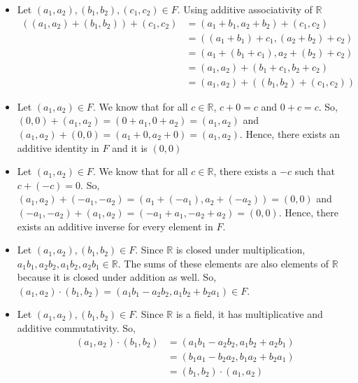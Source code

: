 \documentclass[12pt]{article}
\begin{document}
\begin{enumerate}[start=1,label={\bfseries Problem \arabic*:},leftmargin=1in]
\begin{enumerate}
\begin{itemize}
            \item Let $(a_{1}, a_{2}), (b_{1}, b_{2}), (c_{1},c_{2}) \in F$. Using additive associativity of $\mathbb{R}$ 
            \begin{align*}
                ((a_{1}, a_{2}) +  (b_{1}, b_{2})) + (c_{1}, c_{2}) &= (a_{1} + b_{1}, a_{2} + b_{2}) + (c_{1}, c_{2})\\ 
                &= ((a_{1} + b_{1}) + c_{1}, (a_{2} + b_{2}) + c_{2}) \\ 
                &= (a_{1} + (b_{1} + c_{1}), a_{2} + (b_{2}) + c_{2}) \\ 
                &= (a_1, a_{2}) + (b_{1} + c_{1}, b_{2}+ c_{2}) \\ 
                &= (a_{1}, a_{2}) +((b_{1}, b_{2}) + (c_{1}, c_{2}))
            \end{align*}
            \item Let $(a_{1}, a_{2}) \in F$. We know that for all $c \in \mathbb{R}$, $c+ 0 = c$ and $0 + c = c$.  
            So, $(0, 0) + (a_{1}, a_{2})  = (0 + a_{1}, 0 + a_{2}) = (a_{1}, a_{2})$ and 
            $(a_{1}, a_{2}) + (0, 0) = (a_{1} + 0, a_{2} + 0) = (a_{1}, a_{2})$. Hence, there exists an additive identity in $F$ and it is $(0, 0)$
            \item Let $(a_{1}, a_{2}) \in F$. We know that for all $c \in \mathbb{R}$, there exists a $-c$ such that $c + (-c) = 0$. 
            So, $(a_1, a_{2}) + (-a_{1}, -a_{2}) = (a_{1} + (-a_{1}), a_{2} + (-a_{2})) = (0, 0)$ and 
            $(-a_{1}, -a_{2}) + (a_{1}, a_{2}) = (-a_{1} + a_{1}, -a_{2} + a_{2}) = (0, 0)$. Hence, there exists an additive inverse for every element in $F$. 

            \item Let $(a_{1}, a_{2}), (b_{1}, b_{2}) \in F$. Since $\mathbb{R}$ is closed under multiplication, $a_{1}b_{1}, a_{2}b_{2}, a_{1}b_{2}, a_{2}b_{1} \in \mathbb{R}$. 
            The sums of these elements are also elements of $\mathbb{R}$ because it is closed under addition as well. 
            So, $(a_{1}, a_{2}) \cdot (b_{1}, b_{2}) = (a_{1}b_{1} - a_{2}b_{2}, a_{1}b_{2} + b_{2}a_{1}) \in F$.  
            \item Let $(a_{1}, a_{2}), (b_{1}, b_{2}) \in F$. Since $\mathbb{R}$ is a field, it has multiplicative and additive commutativity. 
            So, 
            \begin{align*}
                (a_{1}, a_{2}) \cdot (b_{1}, b_{2}) &= (a_{1}b_{1} - a_{2}b_{2}, a_{1}b_{2} + a_{2} b_{1})\\
                &= (b_{1}a_{1} - b_{2}a_{2}, b_{1}a_{2} + b_{2}a_{1})\\ 
                &= (b_{1}, b_{2}) \cdot (a_{1}, a_{2}) 
            \end{align*}


\end{itemize}
\end{enumerate}
\end{enumerate}
\end{document}
